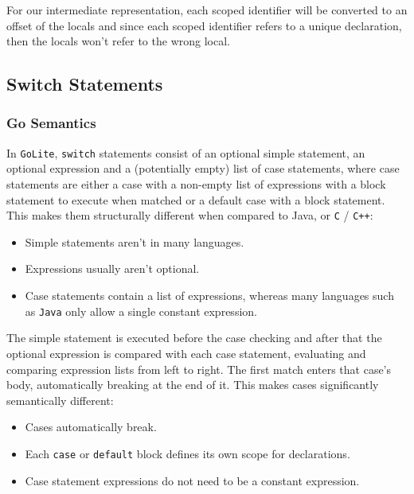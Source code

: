 \documentclass[11pt]{article}
\begin{document}
For our intermediate representation, each scoped identifier will
be converted to an offset of the locals and since each scoped
identifier refers to a unique declaration, then the locals won't
refer to the wrong local.
\subsection{Switch Statements}
\label{sec:org4d6d9e7}
\subsubsection{Go Semantics}
\label{sec:orgf124de0}
In \texttt{GoLite}, \texttt{switch} statements consist of an optional simple
statement, an optional expression and a (potentially empty) list
of case statements, where case statements are either a case with a
non-empty list of expressions with a block statement to execute
when matched or a default case with a block statement. This makes
them structurally different when compared to Java, or \texttt{C} / \texttt{C++}:
\begin{itemize}
\item Simple statements aren't in many languages.
\item Expressions usually aren't optional.
\item Case statements contain a list of expressions, whereas many
languages such as \texttt{Java} only allow a single constant expression.
\end{itemize}
The simple statement is executed before the case checking and
after that the optional expression is compared with each case
statement, evaluating and comparing expression lists from left to
right. The first match enters that case's body, automatically
breaking at the end of it. This makes cases significantly semantically different:
\begin{itemize}
\item Cases automatically break.
\item Each \texttt{case} or \texttt{default} block defines its own scope for declarations.
\item Case statement expressions do not need to be a constant expression.
\end{itemize}
\end{document}
